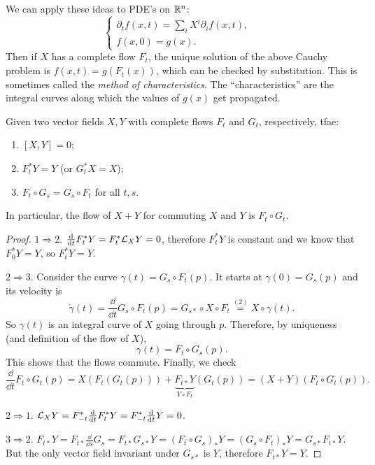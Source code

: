 \begin{rem}
    We can apply these ideas to PDE's on $\mathbb{R}^n$:
    \[\begin{cases}
        \partial_t f(x,t)=\sum _i X^i \partial_i f(x,t),&\\
        f(x,0)=g(x).&
    \end{cases}\]
    Then if $X$ has a complete flow $F_t$, the unique solution of the above Cauchy problem is $f(x,t)=g(F_t(x))$, which can be checked by substitution. This is sometimes called the \emph{method of characteristics}. The ``characteristics'' are the integral curves along which the values of $g(x)$ get propagated.
\end{rem}

\begin{prop}
    Given two vector fields $X,Y$ with complete flows $F_t$ and $G_t$, respectively, \gls{tfae}:
    \begin{enumerate}
        \item $[X,Y]=0$;
        \item $F^\ast_t Y=Y$ (or $G^\ast_t X=X$);
        \item $F_t\circ G_s=G_s\circ F_t$ for all $t,s$. 
    \end{enumerate}
    In particular, the flow of $X+Y$ for commuting $X$ and $Y$ is $F_t\circ G_t$.
\end{prop}
\begin{proof}
    $1\Rightarrow 2$. $\frac{{\mathrm{d}}}{{\mathrm{d}} t}F^\ast_t Y=F^\ast_t \mathcal{L}_X Y=0$, therefore $F^\ast_t Y$ is constant and we know that $F^\ast_0 Y=Y$, so $F^\ast_t Y=Y$.

    $2\Rightarrow 3$. Consider the curve $\gamma(t)=G_s\circ F_t(p)$. It starts at $\gamma(0)=G_s(p)$ and its velocity is
    \[\dot\gamma(t)=\frac{\dd}{\dd t} G_s\circ F_t(p)=G_{s\ast}\circ X\circ F_t\overset{(2)}{=}X\circ\gamma(t).\]
    So $\gamma(t)$ is an integral curve of $X$ going through $p$. Therefore, by uniqueness (and definition of the flow of $X$), 
    \[\gamma(t)=F_t\circ G_s(p).\]
    This shows that the flows commute. Finally, we check 
    \[\frac{\dd}{\dd t} F_t\circ G_t(p)=X(F_t(G_t(p)))+\underbrace{F_{t\ast }Y}_{Y\circ F_t}(G_t(p))=(X+Y)(F_t\circ G_t(p)).\]

    $2\Rightarrow 1$. $\mathcal{L}_X Y=F^\ast_{-t}\frac{{\mathrm{d}}}{{\mathrm{d}} t}F^\ast_t Y=F^\ast_{-t} \frac{{\mathrm{d}}}{{\mathrm{d}} t}Y=0$.

    $3\Rightarrow 2$. $F_{t\ast}Y=F_{t\ast}\frac{\dd}{\dd s}G_s=F_{t\ast} G_{s\ast} Y=(F_t\circ G_s)_\ast Y=(G_s\circ F_t)_\ast Y=G_{s\ast}F_{t\ast}Y$. But the only vector field invariant under $G_{s\ast}$ is $Y$, therefore $F_{t\ast}Y=Y$.
\end{proof}

